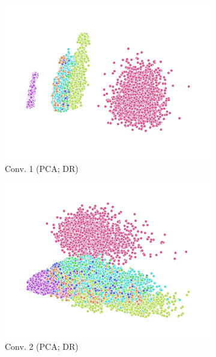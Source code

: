 \begin{figure}
  \begin{subfigure}{0.22\textwidth}
    \includegraphics[width=\textwidth]{figures/chapter6/embeddings/jaco_DR_prop_conv1_PCA.png}
    \caption{Conv. 1 (PCA; DR)}
  \end{subfigure}
  \begin{subfigure}{0.22\textwidth}
    \includegraphics[width=\textwidth]{figures/chapter6/embeddings/jaco_DR_prop_conv2_PCA.png}
    \caption{Conv. 2 (PCA; DR)}
  \end{subfigure}
  \begin{subfigure}{0.22\textwidth}

\end{subfigure}
\end{figure}
